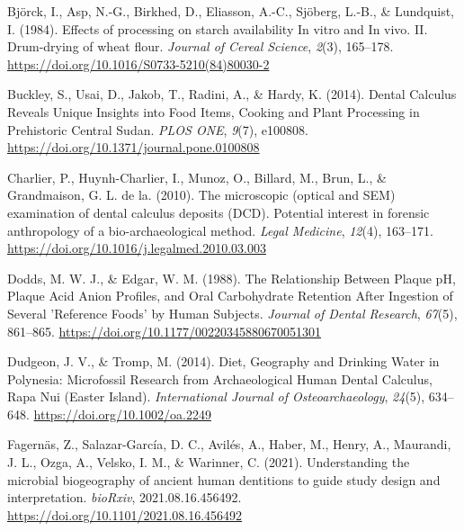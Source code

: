 \documentclass[
  letterpaper,
]{book}
\newlength{\cslhangindent}
\newlength{\cslentryspacingunit} %
\newenvironment{CSLReferences}[2] %
 {%
  \setlength{\parindent}{0pt}
  \ifodd #1
  \let\oldpar\par
  \def\par{\hangindent=\cslhangindent\oldpar}
  \fi
  \setlength{\parskip}{#2\cslentryspacingunit}
 }%
 {}
\begin{document}
\hypertarget{refs-8}{}
\begin{CSLReferences}{1}{0}
\leavevmode{}%
Björck, I., Asp, N.-G., Birkhed, D., Eliasson, A.-C., Sjöberg, L.-B., \&
Lundquist, I. (1984). Effects of processing on starch availability {In}
vitro and {In} vivo. {II}. {Drum-drying} of wheat flour. \emph{Journal
of Cereal Science}, \emph{2}(3), 165--178.
\url{https://doi.org/10.1016/S0733-5210(84)80030-2}

\leavevmode{}%
Buckley, S., Usai, D., Jakob, T., Radini, A., \& Hardy, K. (2014).
Dental {Calculus Reveals Unique Insights} into {Food Items}, {Cooking}
and {Plant Processing} in {Prehistoric Central Sudan}. \emph{PLOS ONE},
\emph{9}(7), e100808. \url{https://doi.org/10.1371/journal.pone.0100808}

\leavevmode{}%
Charlier, P., Huynh-Charlier, I., Munoz, O., Billard, M., Brun, L., \&
Grandmaison, G. L. de la. (2010). The microscopic (optical and {SEM})
examination of dental calculus deposits ({DCD}). {Potential} interest in
forensic anthropology of a bio-archaeological method. \emph{Legal
Medicine}, \emph{12}(4), 163--171.
\url{https://doi.org/10.1016/j.legalmed.2010.03.003}

\leavevmode{}%
Dodds, M. W. J., \& Edgar, W. M. (1988). The {Relationship Between
Plaque pH}, {Plaque Acid Anion Profiles}, and {Oral Carbohydrate
Retention After Ingestion} of {Several} '{Reference Foods}' by {Human
Subjects}. \emph{Journal of Dental Research}, \emph{67}(5), 861--865.
\url{https://doi.org/10.1177/00220345880670051301}

\leavevmode{}%
Dudgeon, J. V., \& Tromp, M. (2014). Diet, {Geography} and {Drinking
Water} in {Polynesia}: {Microfossil Research} from {Archaeological Human
Dental Calculus}, {Rapa Nui} ({Easter Island}). \emph{International
Journal of Osteoarchaeology}, \emph{24}(5), 634--648.
\url{https://doi.org/10.1002/oa.2249}

\leavevmode{}%
Fagernäs, Z., Salazar-García, D. C., Avilés, A., Haber, M., Henry, A.,
Maurandi, J. L., Ozga, A., Velsko, I. M., \& Warinner, C. (2021).
Understanding the microbial biogeography of ancient human dentitions to
guide study design and interpretation. \emph{bioRxiv},
2021.08.16.456492. \url{https://doi.org/10.1101/2021.08.16.456492}


\end{CSLReferences}
\end{document}
